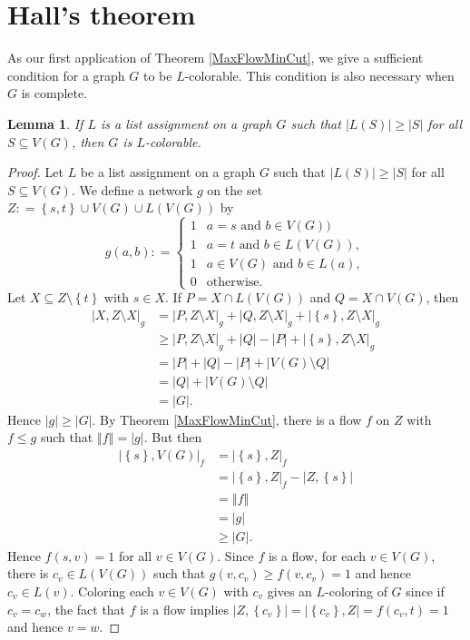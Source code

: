 \documentclass[openany]{tufte-book} %
\theoremstyle{plain}
\newtheorem{lemma}{Lemma}
\newcommand{\set}[1]{\left\{ #1 \right\}}
\newcommand{\card}[1]{\left|#1\right|}
\newcommand{\size}[1]{\left\Vert#1\right\Vert}
\newcommand{\DefinedAs}{\mathrel{\mathop:}=}
\begin{document}
\section{Hall's theorem}
As our first application of Theorem \ref{MaxFlowMinCut}, we give a sufficient condition for a graph $G$ to be $L$-colorable.  This 
condition is also necessary when $G$ is complete.
\begin{lemma}
If $L$ is a list assignment on a graph $G$ such that $\card{L(S)} \ge \card{S}$ for all $S \subseteq V(G)$, then $G$ is $L$-colorable.
\end{lemma}
\begin{proof}
Let $L$ be a list assignment on a graph $G$ such that $\card{L(S)} \ge \card{S}$ for all $S \subseteq V(G)$.  
We define a network $g$ on the set $Z \DefinedAs \set{s,t} \cup V(G) \cup L(V(G))$ by
\[g(a, b) \DefinedAs  \begin{cases} 
      1 & a = s \text{ and } b \in  V(G))\\
      1 & a = t \text{ and } b \in  L(V(G)),\\
	  1 & a \in V(G) \text{ and } b \in L(a),\\
      0 & \text{otherwise} .
   \end{cases}
\]
Let $X \subseteq Z \setminus \set{t}$ with $s \in X$.  If $P = X \cap L(V(G))$ and $Q = X \cap V(G)$, then
\begin{align*}
\card{X, Z\setminus X}_g &= \card{P, Z\setminus X}_g + \card{Q, Z\setminus X}_g + \card{\set{s}, Z\setminus X}_g\\
&\ge \card{P, Z\setminus X}_g + \card{Q} - \card{P} + \card{\set{s}, Z\setminus X}_g\\
&=\card{P} + \card{Q} - \card{P} + \card{V(G)\setminus Q}\\
&=\card{Q} + \card{V(G)\setminus Q}\\
&= \card{G}.
\end{align*}
Hence $\card{g} \ge \card{G}$.  By Theorem \ref{MaxFlowMinCut}, there is a flow $f$ on $Z$ with $f \le g$ such that $\size{f} = \card{g}$.  But then
\begin{align*}
\card{\set{s}, V(G)}_f &=  \card{\set{s}, Z}_f \\
&= \card{\set{s}, Z}_f - \card{Z, \set{s}}\\
&=\size{f}\\
&= \card{g}\\
&\ge\card{G}.
\end{align*}
Hence $f(s,v) = 1$ for all $v \in V(G)$.  Since $f$ is a flow, for each $v \in V(G)$, there is $c_v \in L(V(G))$ such that $g(v, c_v) \ge f(v, c_v) = 1$ and hence $c_v \in L(v)$.
Coloring each $v \in V(G)$ with $c_v$ gives an $L$-coloring of $G$ since if $c_v = c_w$, the fact that $f$ is a flow implies 
$\card{Z, \set{c_v}} = \card{\set{c_v}, Z} = f(c_v, t) = 1$ and hence $v = w$.
\end{proof}
\end{document}

